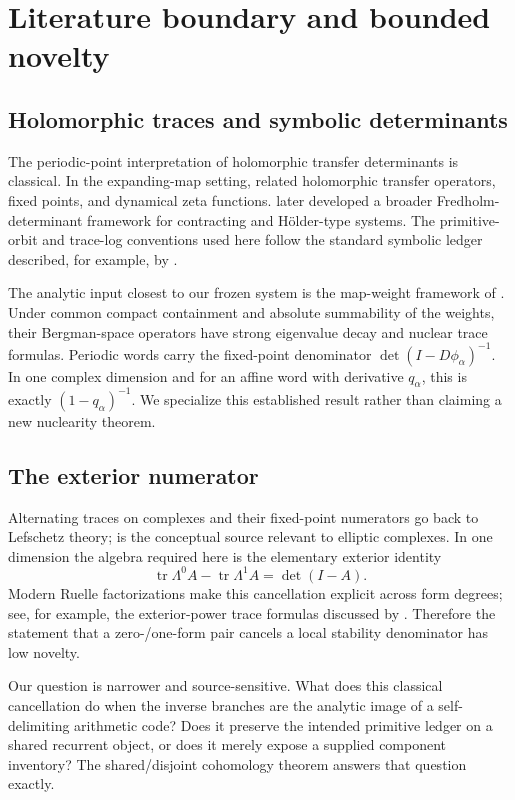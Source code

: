 \section{Literature boundary and bounded novelty}
\label{sec:literature}

\subsection{Holomorphic traces and symbolic determinants}

The periodic-point interpretation of holomorphic transfer determinants is
classical.  In the expanding-map setting, \citet{Ruelle1976} related
holomorphic transfer operators, fixed points, and dynamical zeta functions.
\citet{Ruelle1990} later developed a broader Fredholm-determinant framework
for contracting and H\"older-type systems.  The primitive-orbit and
trace-log conventions used here follow the standard symbolic ledger
described, for example, by \citet{ParryPollicott1990}.

The analytic input closest to our frozen system is the map-weight framework
of \citet{BandtlowJenkinson2008}.  Under common compact containment and
absolute summability of the weights, their Bergman-space operators have
strong eigenvalue decay and nuclear trace formulas.  Periodic words carry
the fixed-point denominator
\(\det(I-D\phi_\alpha)^{-1}\).  In one complex dimension and for an affine
word with derivative \(q_\alpha\), this is exactly
\((1-q_\alpha)^{-1}\).  We specialize this established result rather than
claiming a new nuclearity theorem.

\subsection{The exterior numerator}

Alternating traces on complexes and their fixed-point numerators go back to
Lefschetz theory; \citet{AtiyahBott1967} is the conceptual source relevant
to elliptic complexes.  In one dimension the algebra required here is the
elementary exterior identity
\[
 \operatorname{tr}\Lambda^0 A-
 \operatorname{tr}\Lambda^1 A=\det(I-A).
\]
Modern Ruelle factorizations make this cancellation explicit across form
degrees; see, for example, the exterior-power trace formulas discussed by
\citet{HadfieldKandelSchiavina2020}.  Therefore the statement that a
zero-/one-form pair cancels a local stability denominator has low novelty.

Our question is narrower and source-sensitive.  What does this classical
cancellation do when the inverse branches are the analytic image of a
self-delimiting arithmetic code?  Does it preserve the intended primitive
ledger on a shared recurrent object, or does it merely expose a supplied
component inventory?  The shared/disjoint cohomology theorem answers that
question exactly.

